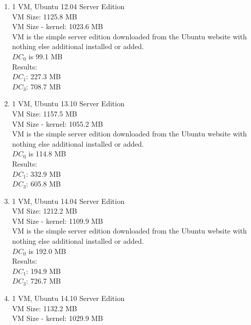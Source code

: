 \begin{enumerate}


\item 1 VM, Ubuntu 12.04 Server Edition\\
VM Size: 1125.8 MB\\
VM Size - kernel: 1023.6 MB\\

VM is the simple server edition downloaded from the Ubuntu website with nothing else additional installed or added.\\

$DC_0$ is 99.1 MB\\
Results:\\
$DC_1$: 227.3 MB\\
$DC_3$: 708.7 MB\\

\item 1 VM, Ubuntu 13.10 Server Edition\\
VM Size: 1157.5 MB\\
VM Size - kernel: 1055.2 MB\\

VM is the simple server edition downloaded from the Ubuntu website with nothing else additional installed or added.\\

$DC_0$ is 114.8 MB\\
Results:\\
$DC_1$: 332.9 MB\\
$DC_3$: 605.8 MB\\

\item 1 VM, Ubuntu 14.04 Server Edition\\
VM Size: 1212.2 MB\\
VM Size - kernel: 1109.9 MB\\

VM is the simple server edition downloaded from the Ubuntu website with nothing else additional installed or added.\\

$DC_0$ is 192.0 MB\\
Results:\\
$DC_1$: 194.9 MB\\
$DC_3$: 726.7 MB\\

\item 1 VM, Ubuntu 14.10 Server Edition\\
VM Size: 1132.2 MB\\
VM Size - kernel: 1029.9 MB\\


\end{enumerate}
